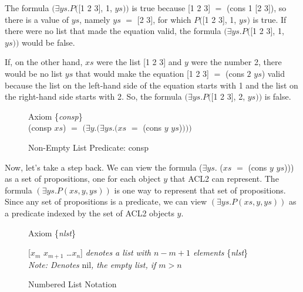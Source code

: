 The formula
$(\exists ys.P($\textsf{[1 2 3]}, \textsf{1}, $ys))$ is true
because \textsf{[1 2 3]} $=$ \textsf{(cons 1 [2 3])},
so there is a value of $ys$, namely $ys$ $=$ \textsf{[2 3]},
for which $P($\textsf{[1 2 3]}, \textsf{1}, $ys)$ is true.
If there were no list that made the equation valid,
the formula $(\exists ys.P($[1 2 3], \textsf{1}, $ys))$
would be false.

If, on the other hand, $xs$ were the list \textsf{[1 2 3]}
and $y$ were the number 2, there would be no list
$ys$ that would make the equation \textsf{[1 2 3]} $=$ \textsf{(cons $2$ $ys$)} valid
because the list on the left-hand side of the equation
starts with 1 and the list on the right-hand side starts with 2.
So, the formula $(\exists ys.P($\textsf{[1 2 3]}, \textsf{2}, $ys))$
is false.

\begin{figure}
\begin{center}
Axiom \{\emph{consp}\} \\
\textsf{(consp $xs$)} $=$  $(\exists y.(\exists ys.(xs$ $=$ \textsf{(cons $y$ $ys$)}$)))$
\end{center}
\caption{Non-Empty List Predicate: consp}
\label{consp-axiom}
\end{figure}

Now, let's take a step back.
We can view the formula
($\exists ys.$ ($xs$ $=$ \textsf{(cons $y$ $ys$)}))
as a set of propositions,
one for each object $y$ that ACL2 can represent.
The formula
$(\exists ys.P(xs, y, ys))$ is one way to represent that
set of propositions.
Since any set of propositions is a predicate,
we can view $(\exists ys.P(xs, y, ys))$ as a predicate indexed
by the set of ACL2 objects $y$.

\begin{figure}
\begin{center}
Axiom \{\emph{nlst}\}

\textsf{[$x_{m}$  $x_{m+1}$ \dots $x_{n}$]}  \emph{denotes a list with $n - m + 1$ elements} \{\emph{nlst}\} \\
\emph{Note: Denotes} \textsf{nil}\emph{, the empty list, if $m > n$}
\end{center}
\caption{Numbered List Notation}
\label{numbered-list-interpretation}
\end{figure}

